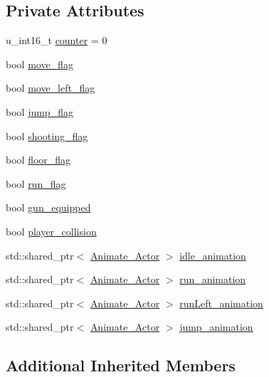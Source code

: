 \subsection*{Private Attributes}
\begin{DoxyCompactItemize}
\item 
u\+\_\+int16\+\_\+t \hyperlink{classAnimated__Player__Actor_ad060f4c5f7fbc808f517fcfbc183df7b}{counter} = 0
\item 
bool \hyperlink{classAnimated__Player__Actor_a1407bc9c5cb95871ddfcc2560005fe1c}{move\+\_\+flag}
\item 
bool \hyperlink{classAnimated__Player__Actor_aeb1af491d3cb43502b9b3018f954c393}{move\+\_\+left\+\_\+flag}
\item 
bool \hyperlink{classAnimated__Player__Actor_a398ca40ea9a8295d6b056765d93c0296}{jump\+\_\+flag}
\item 
bool \hyperlink{classAnimated__Player__Actor_a534150c13901a7d63cc02ae70f09ac3d}{shooting\+\_\+flag}
\item 
bool \hyperlink{classAnimated__Player__Actor_ac03b324c54c1b0785cfa6fcf9f2a7899}{floor\+\_\+flag}
\item 
bool \hyperlink{classAnimated__Player__Actor_aa9fdf3aad648049b0e371655aca50b71}{run\+\_\+flag}
\item 
bool \hyperlink{classAnimated__Player__Actor_a81feb89124afa146b6c4084d0f439420}{gun\+\_\+equipped}
\item 
bool \hyperlink{classAnimated__Player__Actor_abfa9855e7199bfee3d52caa60c858c2e}{player\+\_\+collision}
\item 
std\+::shared\+\_\+ptr$<$ \hyperlink{classAnimate__Actor}{Animate\+\_\+\+Actor} $>$ \hyperlink{classAnimated__Player__Actor_a5b7c54c2ea4a5fdf3f2c875e116e0679}{idle\+\_\+animation}
\item 
std\+::shared\+\_\+ptr$<$ \hyperlink{classAnimate__Actor}{Animate\+\_\+\+Actor} $>$ \hyperlink{classAnimated__Player__Actor_a449e23d0b58757379207ec4e931af48a}{run\+\_\+animation}
\item 
std\+::shared\+\_\+ptr$<$ \hyperlink{classAnimate__Actor}{Animate\+\_\+\+Actor} $>$ \hyperlink{classAnimated__Player__Actor_a99cfc98df7c52de42a4954d4ce97ee7d}{run\+Left\+\_\+animation}
\item 
std\+::shared\+\_\+ptr$<$ \hyperlink{classAnimate__Actor}{Animate\+\_\+\+Actor} $>$ \hyperlink{classAnimated__Player__Actor_a343da9854c906004cf55e0180e257494}{jump\+\_\+animation}
\end{DoxyCompactItemize}
\subsection*{Additional Inherited Members}


